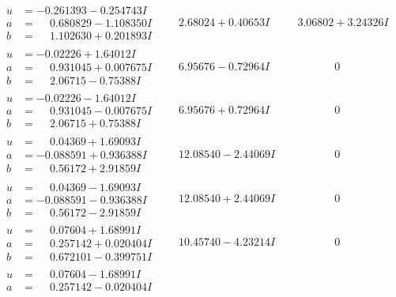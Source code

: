 \documentclass[1p]{elsarticle_modified}
\theoremstyle{definition}
\begin{document}
$$\begin{array}{c|c|c}
\begin{aligned}
u &= -0.261393 - 0.254743 I \\
a &= \phantom{-}0.680829 - 1.108350 I \\
b &= \phantom{-}1.102630 + 0.201893 I\end{aligned}
 & \phantom{-}2.68024 + 0.40653 I & \phantom{-}3.06802 + 3.24326 I \\ \hline\begin{aligned}
u &= -0.02226 + 1.64012 I \\
a &= \phantom{-}0.931045 + 0.007675 I \\
b &= \phantom{-}2.06715 - 0.75388 I\end{aligned}
 & \phantom{-}6.95676 - 0.72964 I & \phantom{-0.000000 } 0 \\ \hline\begin{aligned}
u &= -0.02226 - 1.64012 I \\
a &= \phantom{-}0.931045 - 0.007675 I \\
b &= \phantom{-}2.06715 + 0.75388 I\end{aligned}
 & \phantom{-}6.95676 + 0.72964 I & \phantom{-0.000000 } 0 \\ \hline\begin{aligned}
u &= \phantom{-}0.04369 + 1.69093 I \\
a &= -0.088591 + 0.936388 I \\
b &= \phantom{-}0.56172 + 2.91859 I\end{aligned}
 & \phantom{-}12.08540 - 2.44069 I & \phantom{-0.000000 } 0 \\ \hline\begin{aligned}
u &= \phantom{-}0.04369 - 1.69093 I \\
a &= -0.088591 - 0.936388 I \\
b &= \phantom{-}0.56172 - 2.91859 I\end{aligned}
 & \phantom{-}12.08540 + 2.44069 I & \phantom{-0.000000 } 0 \\ \hline\begin{aligned}
u &= \phantom{-}0.07604 + 1.68991 I \\
a &= \phantom{-}0.257142 + 0.020404 I \\
b &= \phantom{-}0.672101 - 0.399751 I\end{aligned}
 & \phantom{-}10.45740 - 4.23214 I & \phantom{-0.000000 } 0 \\ \hline\begin{aligned}
u &= \phantom{-}0.07604 - 1.68991 I \\
a &= \phantom{-}0.257142 - 0.020404 I \\

\end{aligned}
\end{array}$$
\end{document}
